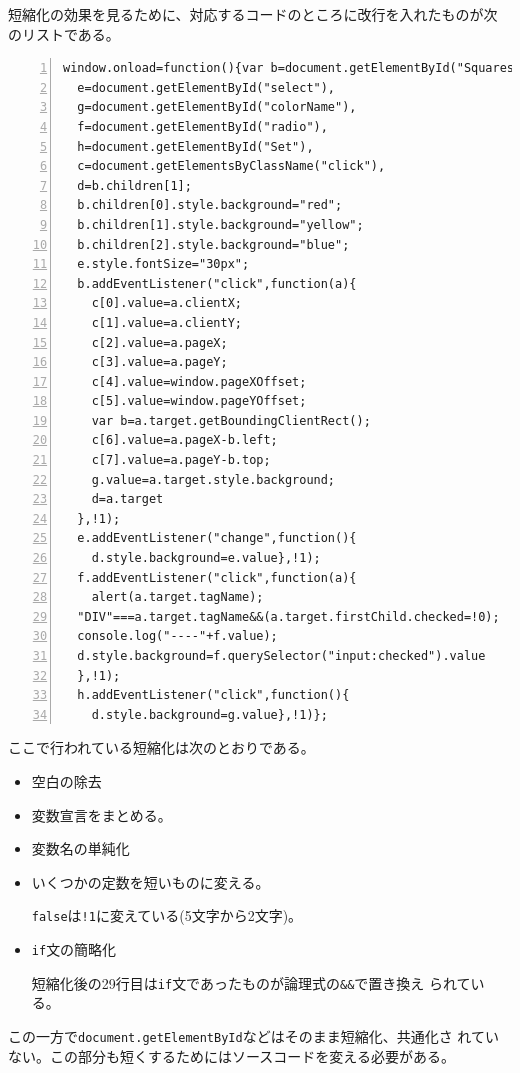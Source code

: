  短縮化の効果を見るために、対応するコードのところに改行を入れたものが次
 のリストである。
 \begin{Verbatim}[numbers=left]
window.onload=function(){var b=document.getElementById("Squares"),
  e=document.getElementById("select"),
  g=document.getElementById("colorName"),
  f=document.getElementById("radio"),
  h=document.getElementById("Set"),
  c=document.getElementsByClassName("click"),
  d=b.children[1];
  b.children[0].style.background="red";
  b.children[1].style.background="yellow";
  b.children[2].style.background="blue";
  e.style.fontSize="30px";
  b.addEventListener("click",function(a){
    c[0].value=a.clientX;
    c[1].value=a.clientY;
    c[2].value=a.pageX;
    c[3].value=a.pageY;
    c[4].value=window.pageXOffset;
    c[5].value=window.pageYOffset;
    var b=a.target.getBoundingClientRect();
    c[6].value=a.pageX-b.left;
    c[7].value=a.pageY-b.top;
    g.value=a.target.style.background;
    d=a.target
  },!1);
  e.addEventListener("change",function(){
    d.style.background=e.value},!1);
  f.addEventListener("click",function(a){
    alert(a.target.tagName);
  "DIV"===a.target.tagName&&(a.target.firstChild.checked=!0);
  console.log("----"+f.value);
  d.style.background=f.querySelector("input:checked").value
  },!1);
  h.addEventListener("click",function(){
    d.style.background=g.value},!1)};
\end{Verbatim}

ここで行われている短縮化は次のとおりである。
\begin{itemize}
 \item 空白の除去
 \item 変数宣言をまとめる。
 \item 変数名の単純化
 \item いくつかの定数を短いものに変える。

			 \texttt{false}は\texttt{!1}に変えている(5文字から2文字)。
 \item \texttt{if}文の簡略化

短縮化後の29行目は\texttt{if}文であったものが論理式の\verb+&&+で置き換え
			 られている。
\end{itemize}
この一方で\texttt{document.getElementById}などはそのまま短縮化、共通化さ
れていない。この部分も短くするためにはソースコードを変える必要がある。

